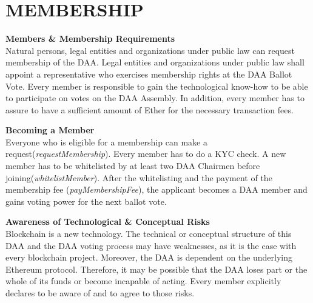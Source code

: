 \section{MEMBERSHIP}\label{sec:membership}

\item \textbf{Members \& Membership Requirements} \\
Natural persons, legal entities and organizations under public law can request membership of the DAA.
Legal entities and organizations under public law shall appoint a representative who exercises membership rights at the DAA Ballot Vote.
Every member is responsible to gain the technological know-how to be able to participate on votes on the DAA Assembly.
In addition, every member has to assure to have a sufficient amount of Ether for the necessary transaction fees.

\item \textbf{Becoming a Member} \\
Everyone who is eligible for a membership can make a request(\emph{requestMembership}).
Every member has to do a KYC check.
A new member has to be whitelisted by at least two DAA Chairmen before joining(\emph{whitelistMember}).
After the whitelisting and the payment of the membership fee (\emph{payMembershipFee}), the applicant becomes a DAA member and gains voting power for the next ballot vote.

\item \textbf{Awareness of Technological \& Conceptual Risks} \\
Blockchain is a new technology.
The technical or conceptual structure of this DAA and the DAA voting process may have weaknesses, as it is the case with every blockchain project.
Moreover, the DAA is dependent on the underlying Ethereum protocol.
Therefore, it may be possible that the DAA loses part or the whole of its funds or become incapable of acting.
Every member explicitly declares to be aware of and to agree to those risks.
